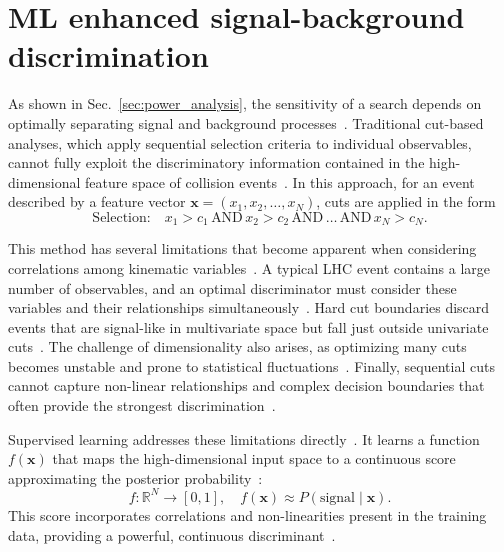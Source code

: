 \section{ML enhanced signal-background discrimination}
\label{sec:machine_learning}

As shown in Sec.~\ref{sec:power_analysis}, the sensitivity of a search depends on optimally separating signal and background processes~\cite{Cowan:2011,Guest2018}. Traditional cut-based analyses, which apply sequential selection criteria to individual observables, cannot fully exploit the discriminatory information contained in the high-dimensional feature space of collision events~\cite{Hastie2009,Guest2018}. In this approach, for an event described by a feature vector $\mathbf{x} = (x_1, x_2, \ldots, x_N)$, cuts are applied in the form~\cite{Hoecker2007}
\begin{equation}
\text{Selection:} \quad x_1 > c_1 \,\text{AND}\, x_2 > c_2 \,\text{AND}\, \ldots \,\text{AND}\, x_N > c_N.
\end{equation}

This method has several limitations that become apparent when considering correlations among kinematic variables~\cite{Hastie2009,Guest2018}. A typical LHC event contains a large number of observables, and an optimal discriminator must consider these variables and their relationships simultaneously~\cite{Hoecker2007,pedregosa_scikit-learn_2011}. Hard cut boundaries discard events that are signal-like in multivariate space but fall just outside univariate cuts~\cite{Hastie2009,Guest2018}. The challenge of dimensionality also arises, as optimizing many cuts becomes unstable and prone to statistical fluctuations~\cite{Hastie2009,friedman_greedy_2001}. Finally, sequential cuts cannot capture non-linear relationships and complex decision boundaries that often provide the strongest discrimination~\cite{Hastie2009,Guest2018}.

Supervised learning addresses these limitations directly~\cite{Hastie2009,Guest2018}. It learns a function $f(\mathbf{x})$ that maps the high-dimensional input space to a continuous score approximating the posterior probability~\cite{Cranmer2015,Platt1999}:
\begin{equation}
f: \mathbb{R}^N \rightarrow [0,1], \quad f(\mathbf{x}) \approx P(\text{signal} \mid \mathbf{x}).
\end{equation}
This score incorporates correlations and non-linearities present in the training data, providing a powerful, continuous discriminant~\cite{Hastie2009,Guest2018}.

